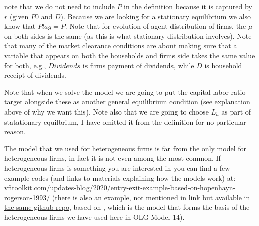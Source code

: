 \noindent note that we do not need to include $P$ in the definition because it is captured by $r$ (given $P0$ and $D$). Because we are looking for a stationary equilibrium we also know that $Plag=P$. Note that for evolution of agent distribution of firms, the $\mu$ on both sides is the same (as this is what stationary distribution involves). Note that many of the market clearance conditions are about making sure that a variable that appears on both the households and firms side takes the same value for both, e.g., $Dividends$ is firms payment of dividends, while $D$ is household receipt of dividends.

Note that when we solve the model we are going to put the capital-labor ratio target alongside these as another general equilibrium condition (see explanation above of why we want this). Note also that we are going to choose $L_h$ as part of statationary equilbrium, I have omitted it from the definition for no particular reason.

The model that we used for heterogeneous firms is far from the only model for heterogeneous firms, in fact it is not even among the most common. If heterogeneous firms is something you are interested in you can find a few example codes (and links to materials explaining how the models work) at:
\href{https://www.vfitoolkit.com/updates-blog/2020/entry-exit-example-based-on-hopenhayn-rogerson-1993/}{vfitoolkit.com/updates-blog/2020/entry-exit-example-based-on-hopenhayn-rogerson-1993/} (there is also an example, not mentioned in link but available in \href{https://github.com/vfitoolkit/VFItoolkit-matlab-examples/tree/master/FirmEntryExitModels}{the same github repo}, based on \cite*{GourioMiao2010}, which is the model that forms the basis of the heterogeneous firms we have used here in OLG Model 14).


